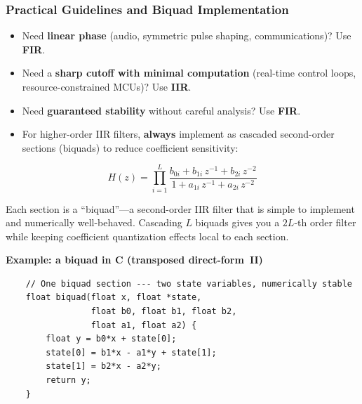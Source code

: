 \subsubsection{Practical Guidelines and Biquad Implementation}

\begin{itemize}
    \item Need \textbf{linear phase} (audio, symmetric pulse shaping, communications)?
          Use \textbf{FIR}.
    \item Need a \textbf{sharp cutoff with minimal computation} (real-time control
          loops, resource-constrained MCUs)? Use \textbf{IIR}.
    \item Need \textbf{guaranteed stability} without careful analysis? Use
          \textbf{FIR}.
    \item For higher-order IIR filters, \textbf{always} implement as cascaded
          second-order sections (biquads) to reduce coefficient sensitivity:
\end{itemize}
\begin{equation}
H(z) = \prod_{i=1}^{L}
       \frac{b_{0i} + b_{1i}\,z^{-1} + b_{2i}\,z^{-2}}
            {1   + a_{1i}\,z^{-1} + a_{2i}\,z^{-2}}
\end{equation}

Each section is a ``biquad''---a second-order IIR filter that is simple to
implement and numerically well-behaved. Cascading $L$ biquads gives you a
$2L$-th order filter while keeping coefficient quantization effects local to each
section.

\textbf{Example: a biquad in C (transposed direct-form~II)}
\begin{verbatim}
    // One biquad section --- two state variables, numerically stable
    float biquad(float x, float *state,
                 float b0, float b1, float b2,
                 float a1, float a2) {
        float y = b0*x + state[0];
        state[0] = b1*x - a1*y + state[1];
        state[1] = b2*x - a2*y;
        return y;
    }
\end{verbatim}

